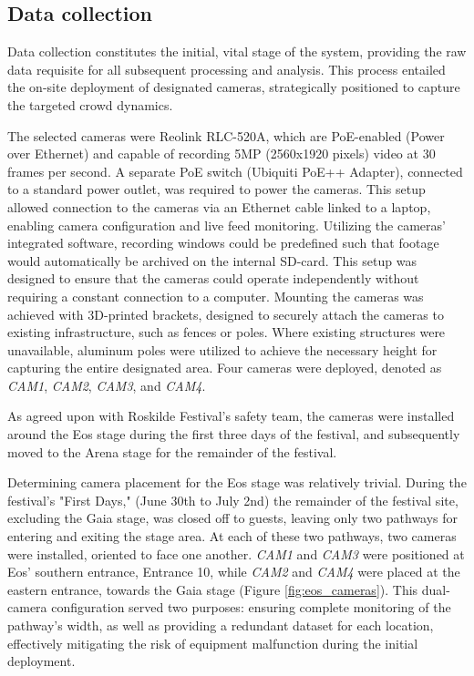 \subsection{Data collection}
\label{sec:data_collection}

Data collection constitutes the initial, vital stage of the system, providing the raw data requisite for all subsequent processing and analysis. This process entailed the on-site deployment of designated cameras, strategically positioned to capture the targeted crowd dynamics.

The selected cameras were Reolink RLC-520A, which are PoE-enabled (Power over Ethernet) and capable of recording 5MP (2560x1920 pixels) video at 30 frames per second. A separate PoE switch (Ubiquiti PoE++ Adapter), connected to a standard power outlet, was required to power the cameras. This setup allowed connection to the cameras via an Ethernet cable linked to a laptop, enabling camera configuration and live feed monitoring. Utilizing the cameras' integrated software, recording windows could be predefined such that footage would automatically be archived on the internal SD-card. This setup was designed to ensure that the cameras could operate independently without requiring a constant connection to a computer. Mounting the cameras was achieved with 3D-printed brackets, designed to securely attach the cameras to existing infrastructure, such as fences or poles. Where existing structures were unavailable, aluminum poles were utilized to achieve the necessary height for capturing the entire designated area. Four cameras were deployed, denoted as \textit{CAM1}, \textit{CAM2}, \textit{CAM3}, and \textit{CAM4}.

As agreed upon with Roskilde Festival's safety team, the cameras were installed around the Eos stage during the first three days of the festival, and subsequently moved to the Arena stage for the remainder of the festival.

Determining camera placement for the Eos stage was relatively trivial. During the festival's "First Days," (June 30th to July 2nd) the remainder of the festival site, excluding the Gaia stage, was closed off to guests, leaving only two pathways for entering and exiting the stage area. At each of these two pathways, two cameras were installed, oriented to face one another. \textit{CAM1} and \textit{CAM3} were positioned at Eos' southern entrance, Entrance 10, while \textit{CAM2} and \textit{CAM4} were placed at the eastern entrance, towards the Gaia stage (Figure \ref{fig:eos_cameras}). This dual-camera configuration served two purposes: ensuring complete monitoring of the pathway's width, as well as providing a redundant dataset for each location, effectively mitigating the risk of equipment malfunction during the initial deployment.

